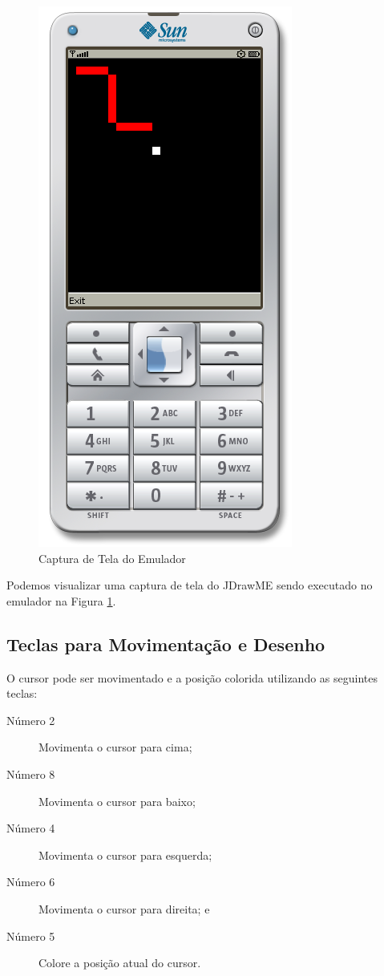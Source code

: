 \documentclass{article}
\begin{document}
\begin{figure}
    \centering{}
    \includegraphics[scale=0.4]{screenshot01-emulator.png}
    \caption{Captura de Tela do Emulador}
    \label{fig:emulador}
\end{figure}

Podemos visualizar uma captura de tela do JDrawME sendo executado no emulador na
Figura \ref{fig:emulador}.

\subsection{Teclas para Movimentação e Desenho}

O cursor pode ser movimentado e a posição colorida utilizando as seguintes
teclas:

\begin{description}
\item[Número 2] Movimenta o cursor para cima;
\item[Número 8] Movimenta o cursor para baixo;
\item[Número 4] Movimenta o cursor para esquerda;
\item[Número 6] Movimenta o cursor para direita; e
\item[Número 5] Colore a posição atual do cursor.
\end{description}
\end{document}
